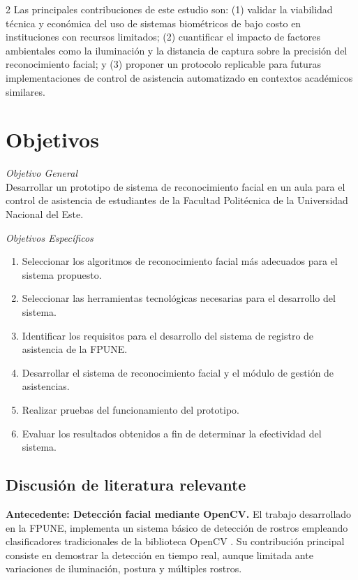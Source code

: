 \documentclass[10pt,a4paper]{article}
\begin{document}
\begin{multicols}{2}
Las principales contribuciones de este estudio son: (1) validar la viabilidad técnica y económica del uso de sistemas biométricos de bajo costo en instituciones con recursos limitados; (2) cuantificar el impacto de factores ambientales como la iluminación y la distancia de captura sobre la precisión del reconocimiento facial; y (3) proponer un protocolo replicable para futuras implementaciones de control de asistencia automatizado en contextos académicos similares.

\section{Objetivos}

\textit{Objetivo General} \\
Desarrollar un prototipo de sistema de reconocimiento facial en un aula para el control de asistencia de estudiantes de la Facultad Politécnica de la Universidad Nacional del Este.

\vspace{0.3cm}

\textit{Objetivos Específicos}
\begin{enumerate}
    \item Seleccionar los algoritmos de reconocimiento facial más adecuados para el sistema propuesto.
    \item Seleccionar las herramientas tecnológicas necesarias para el desarrollo del sistema.
    \item Identificar los requisitos para el desarrollo del sistema de registro de asistencia de la FPUNE.
    \item Desarrollar el sistema de reconocimiento facial y el módulo de gestión de asistencias.
    \item Realizar pruebas del funcionamiento del prototipo.
    \item Evaluar los resultados obtenidos a fin de determinar la efectividad del sistema.
\end{enumerate}



\subsection{Discusión de literatura relevante}

\textbf{Antecedente: Detección facial mediante OpenCV.} El trabajo desarrollado en la FPUNE, implementa un sistema básico de detección de rostros empleando clasificadores tradicionales de la biblioteca OpenCV \cite{detecFacialOpenCV}. Su contribución principal consiste en demostrar la detección en tiempo real, aunque limitada ante variaciones de iluminación, postura y múltiples rostros.


\end{multicols}
\end{document}
